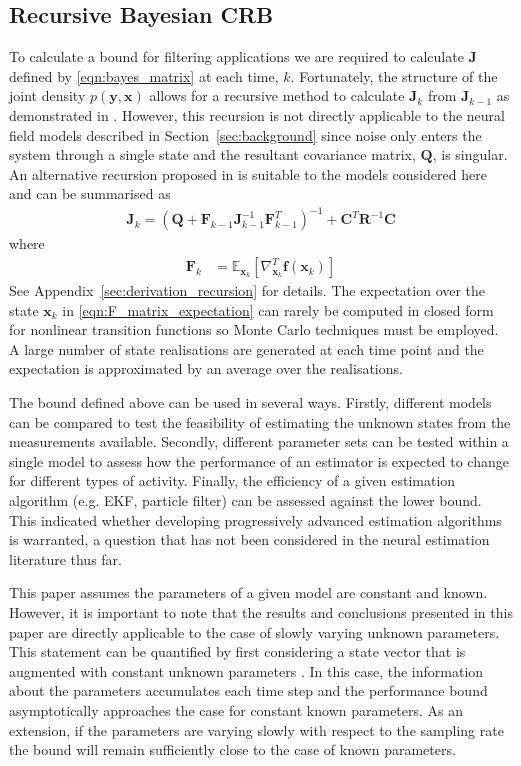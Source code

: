 \documentclass{article}
\renewcommand{\vec}[1]{\ensuremath{{\boldsymbol #1}}}
\newcommand{\mat}[1]{\ensuremath{\boldsymbol{#1}}}
\begin{document}
\subsection{Recursive Bayesian CRB}
To calculate a bound for filtering applications we are required to calculate $\mat J$ defined by \eqref{eqn:bayes_matrix} at each time, $k$. Fortunately, the structure of the joint density $p(\vec y,\vec x)$ allows for a recursive method to calculate $\mat J_k$ from $\mat J_{k-1}$ as demonstrated in \cite{Tichavsky1998}. However, this recursion is not directly applicable to the neural field models described in Section~\ref{sec:background} since noise only enters the system through a single state and the resultant covariance matrix, $\mat Q$, is singular. An alternative recursion proposed in \cite{Bergman2001} is suitable to the models considered here and can be summarised as 
\begin{align}
	\mat J_k = \left( \mat Q + {\mat F}_{k-1} \mat J_{k-1}^{-1} {\mat F}_{k-1}^T\right)^{-1} + \mat C^T \mat R^{-1} \mat C
\end{align}
where
\begin{align}
		{\mat F}_k &= \mathbb E_{\vec x_k} \left[ \nabla_{\vec x_k}^T \vec f(\vec x_k)\right] 
		\label{eqn:F_matrix_expectation}
\end{align}
See Appendix~\ref{sec:derivation_recursion} for details. The expectation over the state $\vec x_k$ in \eqref{eqn:F_matrix_expectation} can rarely be computed in closed form for nonlinear transition functions so Monte Carlo techniques must be employed. A large number of state realisations are generated at each time point and the expectation is approximated by an average over the realisations.

The bound defined above can be used in several ways. Firstly, different models can be compared to test the feasibility of estimating the unknown states from the measurements available. Secondly, different parameter sets can be tested within a single model to assess how the performance of an estimator is expected to change for different types of activity. Finally, the efficiency of a given estimation algorithm (e.g. EKF, particle filter) can be assessed against the lower bound. This indicated whether developing progressively advanced estimation algorithms is warranted, a question that has not been considered in the neural estimation literature thus far.

This paper assumes the parameters of a given model are constant and known. However, it is important to note that the results and conclusions presented in this paper are directly applicable to the case of slowly varying unknown parameters. This statement can be quantified by first considering a state vector that is augmented with constant unknown parameters \cite{sdf}. In this case, the information about the parameters accumulates each time step and the performance bound asymptotically approaches the case for constant known parameters. As an extension, if the parameters are varying slowly with respect to the sampling rate the bound will remain sufficiently close to the case of known parameters.
\end{document}
